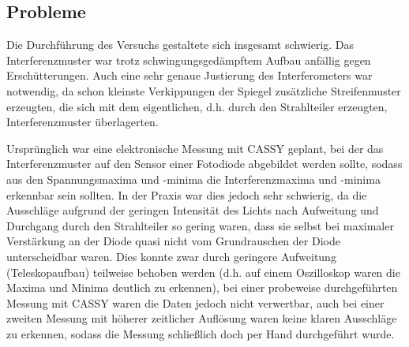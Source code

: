 \subsection{Probleme}
Die Durchführung des Versuchs gestaltete sich insgesamt schwierig. Das Interferenzmuster war trotz schwingungsgedämpftem Aufbau anfällig gegen Erschütterungen. Auch eine sehr genaue Justierung des Interferometers war notwendig, da schon kleinste Verkippungen der Spiegel zusätzliche Streifenmuster erzeugten, die sich mit dem eigentlichen, d.h. durch den Strahlteiler erzeugten, Interferenzmuster überlagerten.

Ursprünglich war eine elektronische Messung mit CASSY geplant, bei der das Interferenzmuster auf den Sensor einer Fotodiode abgebildet werden sollte, sodass aus den Spannungsmaxima und -minima die Interferenzmaxima und -minima erkennbar sein sollten.
In der Praxis war dies jedoch sehr schwierig, da die Ausschläge aufgrund der geringen Intensität des Lichts nach Aufweitung und Durchgang durch den Strahlteiler so gering waren, dass sie selbst bei maximaler Verstärkung an der Diode quasi nicht vom Grundrauschen der Diode unterscheidbar waren. Dies konnte zwar durch geringere Aufweitung (Teleskopaufbau) teilweise behoben werden (d.h. auf einem Oszilloskop waren die Maxima und Minima deutlich zu erkennen), bei einer probeweise durchgeführten Messung mit CASSY waren die Daten jedoch nicht verwertbar, auch bei einer zweiten Messung mit höherer zeitlicher Auflösung waren keine klaren Ausschläge zu erkennen, sodass die Messung schließlich doch per Hand durchgeführt wurde.
